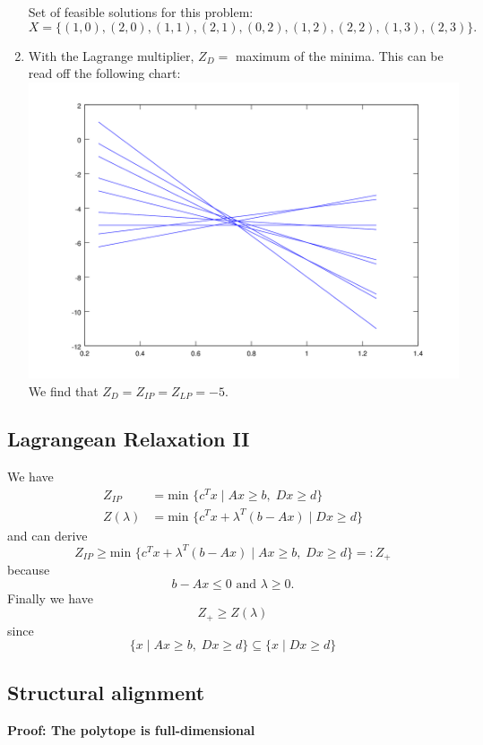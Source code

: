 \documentclass[a4paper, oneside]{scrartcl}
\begin{document}
\begin{enumerate}
Set of feasible solutions for this problem: 
\[
X = \{(1, 0), (2, 0), (1, 1), (2,
1), (0, 2), (1, 2), (2, 2), (1, 3), (2, 3)\}.
\]
\item With the Lagrange multiplier, $Z_D =$ maximum of the minima. This can be
read off the following chart:\\
\includegraphics[width=\textwidth]{ex11_1_c_good.png}\\
We find that $Z_D = Z_{IP} = Z_{LP} = -5$.
\end{enumerate}

\subsection{Lagrangean Relaxation II}

We have 
\begin{align}
Z_{IP} &= \text{min } \{ c^T x \; | \; Ax \geq b, \; Dx \geq d\} \\
Z(\lambda) &= \text{min } \{ c^T x + \lambda^T (b-Ax) \; | \; Dx \geq d\}
\end{align}
and can derive
\[ Z_{IP} \geq \text{min } \{ c^T x + \lambda^T (b-Ax) \; | \; Ax \geq b, \; Dx \geq d\} =: Z_{+} \]
because
\[b-Ax \leq 0  \text{ and } \lambda \geq 0. \]
Finally we have 
\[Z_{+} \geq Z(\lambda) \]
since 
\[ \{x \; | \; Ax\geq b, \; Dx \geq d\} \subseteq \{x \; | \; Dx\geq d\} \]

\subsection{Structural alignment}

\noindent \textbf{Proof: The polytope is full-dimensional}
\end{document}
